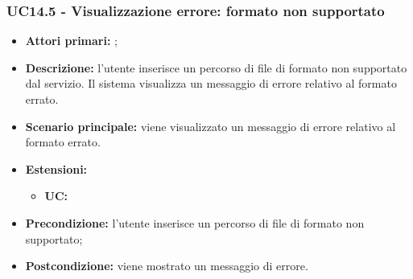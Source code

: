 \subsubsection{UC14.5 - Visualizzazione errore: formato non supportato}
\begin{itemize}
	\item \textbf{Attori primari:} \us{};
	\item \textbf{Descrizione:} l’utente inserisce un percorso di file di formato non supportato dal servizio. Il sistema visualizza un messaggio di errore relativo al formato errato.
	\item \textbf{Scenario principale:} viene visualizzato un messaggio di errore relativo al formato errato.
	\item \textbf{Estensioni:} 
	\begin{itemize}
		\item \textbf{UC:} 
	\end{itemize}
	\item \textbf{Precondizione:} l'utente inserisce un percorso di file di formato non supportato;
	\item \textbf{Postcondizione:} viene mostrato un messaggio di errore. 
\end{itemize}